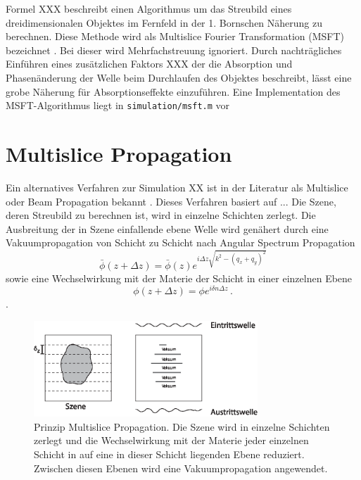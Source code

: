 	Formel XXX beschreibt einen Algorithmus um das Streubild eines dreidimensionalen Objektes im Fernfeld in der 1. Bornschen Näherung zu berechnen. Diese Methode wird als Multislice Fourier Transformation (MSFT) bezeichnet \cite{barke2015}. Bei dieser wird Mehrfachstreuung ignoriert. Durch nachträgliches Einführen eines zusätzlichen Faktors XXX der die Absorption und Phasenänderung der Welle beim Durchlaufen des Objektes beschreibt, lässt eine grobe Näherung für Absorptionseffekte einzuführen. Eine Implementation des MSFT-Algorithmus liegt in \texttt{simulation/msft.m} vor 

\section{Multislice Propagation}
	Ein alternatives Verfahren zur Simulation XX ist in der Literatur als Multislice oder Beam Propagation bekannt \cite{hare1994,cowley1957}. Dieses Verfahren basiert auf ...
	Die Szene, deren Streubild zu berechnen ist, wird in einzelne Schichten zerlegt.
	Die Ausbreitung der in Szene einfallende ebene Welle wird genähert durch eine Vakuumpropagation von Schicht zu Schicht nach Angular Spectrum Propagation
	\begin{equation}
\bar{\phi}\left(z+\Delta z\right)=\bar{\phi}(z)e^{i\Delta z\sqrt{k^2-(q_x+q_y)^2}}
	\end{equation}
	sowie eine Wechselwirkung mit der Materie der Schicht in einer einzelnen Ebene
	\begin{equation}
		\phi(z+\Delta z)=\phi e^{i\delta n \Delta z} \, .
	\end{equation}.
	
	\begin{figure}
		\centering
		\includegraphics[width=0.75\textwidth]{images/multislice.eps}
		\caption[Abbildungstext im Abbildungsverzeichnis]{Prinzip Multislice Propagation. Die Szene wird in einzelne Schichten zerlegt und die Wechselwirkung mit der Materie jeder einzelnen Schicht in auf eine in dieser Schicht liegenden Ebene reduziert. Zwischen diesen Ebenen wird eine Vakuumpropagation angewendet.}
		\label{Abb:BspAbbildung}
	\end{figure} 
	

